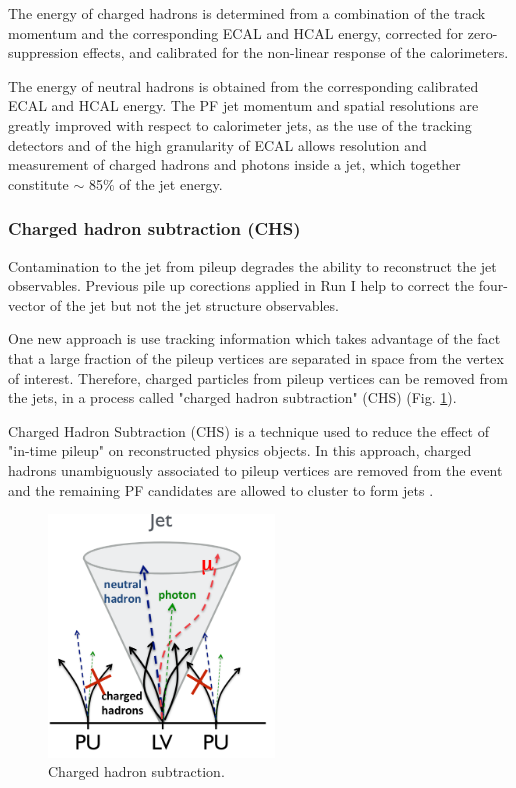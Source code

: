 The energy of charged hadrons is determined from a combination of the track momentum and the corresponding ECAL and HCAL energy, corrected for zero-suppression effects, and calibrated for the non-linear response of the calorimeters.

The energy of neutral hadrons is obtained from the corresponding calibrated ECAL and HCAL energy. The PF jet momentum and spatial resolutions are greatly improved with respect to calorimeter jets, as the use of the tracking detectors and of the high granularity of ECAL allows resolution and measurement of charged hadrons and photons inside a jet, which together constitute $\sim$ 85$\%$ of the jet energy.

\subsubsection{Charged hadron subtraction (CHS)}

Contamination to the jet from pileup degrades the ability to reconstruct the jet observables. Previous pile up corections applied in Run I help to correct the four-vector of the jet but not
the jet structure observables.

One new approach is use tracking information which takes advantage of the fact that a large fraction of the pileup vertices are separated in space from the vertex of interest. Therefore, charged particles from pileup vertices can be removed from the jets, in a process called "charged hadron subtraction" (CHS) (Fig. \ref{jetchsfigure}).

Charged Hadron Subtraction (CHS) is a technique used to reduce the effect of "in-time pileup" on reconstructed physics objects. In this approach, charged hadrons unambiguously associated
to pileup vertices are removed from the event and the remaining PF candidates are allowed to cluster to form jets \cite{pileupchs}.
\begin{figure}[H]
  \centering
\includegraphics[width=6cm]{physics_objects_plots/chs}
\caption{Charged hadron subtraction. \label{jetchsfigure}}
\end{figure}

